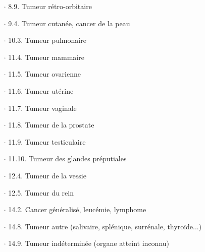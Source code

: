 \documentclass[a4paper,10pt]{article}
\begin{document}
\begin{enumerate}
\begin{itemize}
\begin{itemize}
\item[$\cdot$ 8.9.]Tumeur rétro-orbitaire
\item[$\cdot$ 9.4.]Tumeur cutanée, cancer de la peau
\item[$\cdot$ 10.3.]Tumeur pulmonaire
\item[$\cdot$ 11.4.]Tumeur mammaire
\item[$\cdot$ 11.5.]Tumeur ovarienne
\item[$\cdot$ 11.6.]Tumeur utérine
\item[$\cdot$ 11.7.]Tumeur vaginale
\item[$\cdot$ 11.8.]Tumeur de la prostate
\item[$\cdot$ 11.9.]Tumeur testiculaire
\item[$\cdot$ 11.10.]Tumeur des glandes préputiales
\item[$\cdot$ 12.4.]Tumeur de la vessie
\item[$\cdot$ 12.5.]Tumeur du rein
\item[$\cdot$ 14.2.]Cancer généralisé, leucémie, lymphome
\item[$\cdot$ 14.8.]Tumeur autre (salivaire, splénique, surrénale, thyroïde...) 
\item[$\cdot$ 14.9.]Tumeur indéterminée (organe atteint inconnu)
\end{itemize}
\end{itemize}
\end{enumerate}
\end{document}
